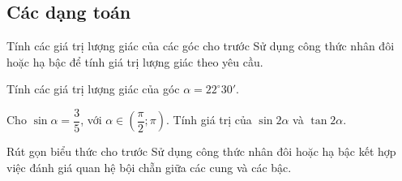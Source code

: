 \subsection{Các dạng toán}
\begin{dang}{Tính các giá trị lượng giác của các góc cho trước}
	Sử dụng công thức nhân đôi hoặc hạ bậc để tính giá trị lượng giác theo yêu cầu.
\end{dang}
\begin{vd}%
	Tính các giá trị lượng giác của góc $\alpha=22^\circ30'$.
\end{vd}
\begin{vd}%
	Cho $\sin\alpha=\dfrac{3}{5}$, với $\alpha\in\left(\dfrac{\pi}{2};\pi\right)$. Tính giá trị của $\sin2\alpha$ và $\tan2\alpha$.
\end{vd}
\begin{dang}{Rút gọn biểu thức cho trước}
	Sử dụng công thức nhân đôi hoặc hạ bậc kết hợp việc đánh giá quan hệ bội chẵn giữa các cung và các bậc.
\end{dang}
